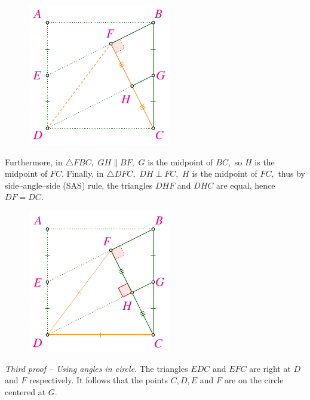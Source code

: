 \begin{multicols}{2}
\begin{figure}[H]
		\includegraphics[width= 0.65\linewidth]{2022-2-ms-1-1-d.pdf}
		\vspace*{-5pt}
	\end{figure}	
	Furthermore, in $\triangle FBC,$ $GH \parallel BF,$ $G$ is the midpoint of $BC,$
	so $H$ is the midpoint of $FC.$
	Finally, in $\triangle DFC,$ $DH \perp FC,$ $H$ is the midpoint of $FC,$
	thus by side--angle--side (SAS) rule, the triangles $ DHF$ and $DHC$ are equal, hence $DF = DC.$
	\begin{figure}[H]
		\vspace*{-10pt}
		\centering
		\captionsetup{labelformat= empty, justification=centering}
		\includegraphics[width= 0.65\linewidth]{2022-2-ms-1-1-e.pdf}
		\vspace*{-15pt}
	\end{figure}		
	\textit{Third proof -- Using angles in circle}.
	The triangles $EDC$ and $ EFC$ are right at $D$ and $F$ respectively. It follows that the points $C, D, E$ and $F$ are on the circle centered at $G.$

\end{multicols}
